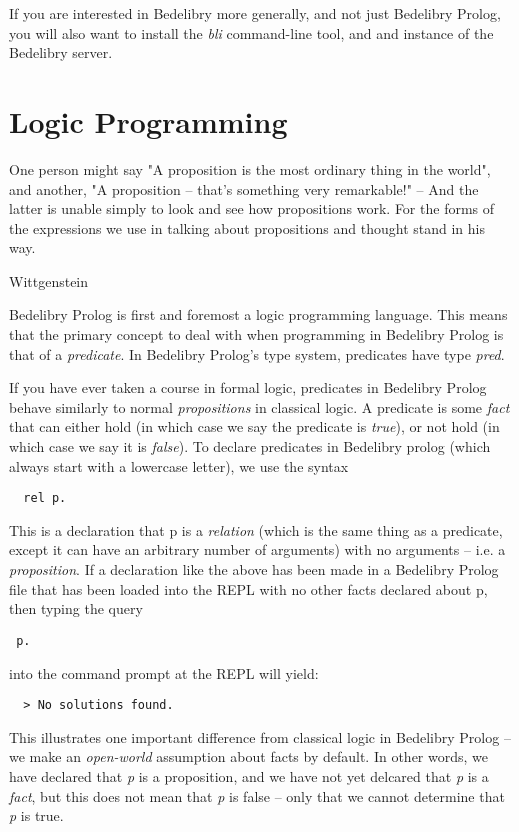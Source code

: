 \documentclass{book}
\begin{document}
If you are interested in Bedelibry more generally, and not just Bedelibry Prolog, you will also want to install the \textit{bli} command-line tool, and and instance of the Bedelibry server. 

\chapter{Logic Programming}

\epigraph{One person might say "A proposition is the most ordinary thing in the world", and another, "A proposition -- that's something very remarkable!" -- And the latter is unable simply to look and see how propositions work. For the forms of the expressions we use in talking about propositions and thought stand in his way.}{Wittgenstein}

Bedelibry Prolog is first and foremost a logic programming language. This means that the primary concept to deal with when programming in Bedelibry Prolog is that of a \textit{predicate}. In Bedelibry Prolog's type system, predicates have type \textit{pred}. 

If you have ever taken a course in formal logic, predicates in Bedelibry Prolog behave similarly to normal \textit{propositions} in classical logic. A predicate is some \textit{fact} that can either hold (in which case we say the predicate is \textit{true}), or not hold (in which case we say it is \textit{false}). To declare predicates in Bedelibry prolog (which always start with a lowercase letter), we use the syntax

\begin{verbatim}
  rel p.
\end{verbatim}

This is a declaration that p is a \textit{relation} (which is the same thing as a predicate, except it can have an arbitrary number of arguments) with no arguments -- i.e. a \textit{proposition}. If a declaration like the above has been made in a Bedelibry Prolog file that has been loaded into the REPL with no other facts declared about p, then typing the query \begin{verbatim} p. \end{verbatim} into the command prompt at the REPL will yield:

\begin{verbatim}
  > No solutions found.
\end{verbatim}

This illustrates one important difference from classical logic in Bedelibry Prolog -- we make an \textit{open-world} assumption about facts by default. In other words, we have declared that \textit{p} is a proposition, and we have not yet delcared that \textit{p} is a \textit{fact}, but this does not mean that \textit{p} is false -- only that we cannot determine that \textit{p} is true. 
\end{document}
